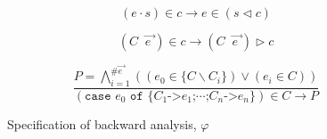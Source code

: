 \documentclass[preprint]{sigplanconf}
\newcommand{\T}[1]{\texttt{#1}}
\newcommand{\D}{\ensuremath{\cdot}} %
\newcommand{\g}[1]{\{#1\}} %
\newcommand{\vecto}[1]{\overrightarrow{#1\;}}
\newcommand{\gap}{\;\;}
\begin{document}
\begin{figure}

\renewcommand\theequation{sel}
\begin{equation}
    (e\D{}s) \in c \rightarrow
    e \in (s \triangleleft c)
\end{equation}

\renewcommand\theequation{con}
\begin{equation}
    (C \gap \vecto{e}) \in c \rightarrow
    (C \gap \vecto{e}) \triangleright c
\end{equation}

\renewcommand\theequation{cas}
\begin{equation}
\frac
    {
        P =
        \bigwedge_{i=1}^{\#\vecto{e}}
        (
            (e_0 \in \g{C \backslash C_i})
            \vee
            (e_i \in C)
        )
    }
    {
        (\T{case } e_0 \T{ of \{}C_1 \T{->} e_1\T{;} \cdots
        \T{;} C_n \T{->} e_n \}) \in C \rightarrow P
    }
\end{equation}

\caption{Specification of backward analysis, $\varphi$} %
\label{fig:backward}
\end{figure}
\end{document}

